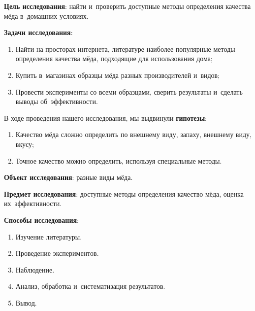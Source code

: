 \bigskip
{}



\makeProcTitleSchool


\textbf{Цель исследования}: найти и~проверить доступные методы определения качества мёда в~домашних условиях.

\textbf{Задачи исследования}:
\begin{enumerate}[noitemsep]\vspace{-8pt}
\item  Найти на просторах интернета, литературе наиболее популярные методы определения качества мёда, подходящие для использования дома;
\item  Купить в~магазинах образцы мёда разных производителей и~видов;
\item  Провести эксперименты со всеми образцами, сверить результаты и~сделать выводы об~эффективности.
\end{enumerate}\vspace{-8pt}
В ходе проведения нашего исследования, мы выдвинули \textbf{гипотезы}:
\begin{enumerate}[noitemsep]\vspace{-8pt}
\item  Качество мёда сложно определить по внешнему виду, запаху, внешнему виду, вкусу;
\item  Точное качество можно определить, используя специальные методы.
\end{enumerate}\vspace{-8pt}
\textbf{Объект исследования}: разные виды мёда.

\textbf{Предмет исследования}: доступные методы определения качество мёда, оценка их~эффективности.


\textbf{Способы исследования}:
\begin{enumerate}[noitemsep]\vspace{-8pt}
\item  Изучение литературы.
\item  Проведение экспериментов.
\item  Наблюдение.
\item  Анализ, обработка и~систематизация результатов.
\item  Вывод.
\end{enumerate}\vspace{-8pt}

